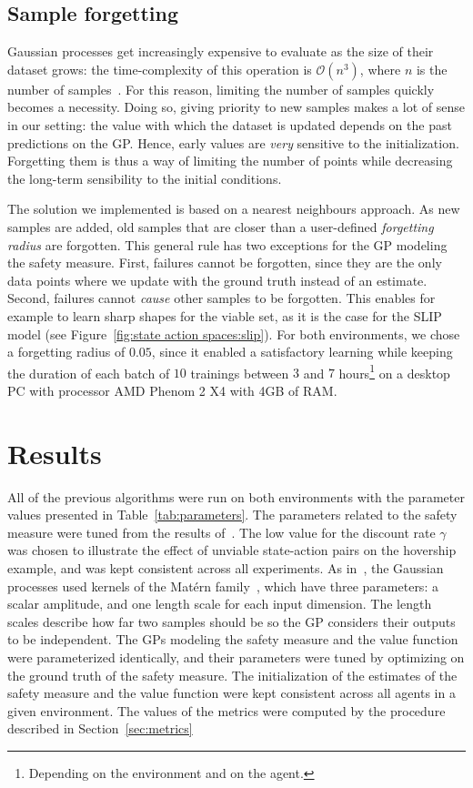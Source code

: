 \subsection{Sample forgetting} \label{sec:sample forgetting}
Gaussian processes get increasingly expensive to evaluate as the size of their dataset grows: the time-complexity of this operation is $\mathcal{O}(n^3)$, where $n$ is the number of samples~\cite{williams2006gaussian}. For this reason, limiting the number of samples quickly becomes a necessity. Doing so, giving priority to new samples makes a lot of sense in our setting: the value with which the dataset is updated depends on the past predictions on the GP. Hence, early values are\emph{ very} sensitive to the initialization. Forgetting them is thus a way of limiting the number of points while decreasing the long-term sensibility to the initial conditions.\par
The solution we implemented is based on a nearest neighbours approach. As new samples are added, old samples that are closer than a user-defined\emph{ forgetting radius} are forgotten. This general rule has two exceptions for the GP modeling the safety measure. First, failures cannot be forgotten, since they are the only data points where we update with the ground truth instead of an estimate. Second, failures cannot\emph{ cause} other samples to be forgotten. This enables for example to learn sharp shapes for the viable set, as it is the case for the SLIP model (see Figure~\ref{fig:state action spaces:slip}). For both environments, we chose a forgetting radius of $0.05$, since it enabled a satisfactory learning while keeping the duration of each batch of $10$ trainings between $3$ and $7$ hours\footnote{Depending on the environment and on the agent.} on a desktop PC with processor AMD Phenom 2 X4 with 4GB of RAM.

\section{Results} \label{sec:results}
All of the previous algorithms were run on both environments with the parameter values presented in Table~\ref{tab:parameters}. The parameters related to the safety measure were tuned from the results of~\textcite{heim2020learnable}. The low value for the discount rate $\gamma$ was chosen to illustrate the effect of unviable state-action pairs on the hovership example, and was kept consistent across all experiments. As in~\cite{heim2020learnable}, the Gaussian processes used kernels of the Matérn family~\cite[Chapter\,18]{williams2006gaussian}, which have three parameters: a scalar amplitude, and one length scale for each input dimension. The length scales describe how far two samples should be so the GP considers their outputs to be independent. The GPs modeling the safety measure and the value function were parameterized identically, and their parameters were tuned by optimizing on the ground truth of the safety measure. The initialization of the estimates of the safety measure and the value function were kept consistent across all agents in a given environment. The values of the metrics were computed by the procedure described in Section~\ref{sec:metrics}

